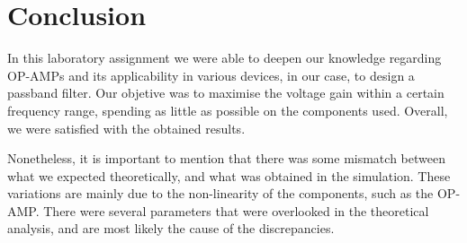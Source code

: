 \section{Conclusion}
\label{resan}
In this laboratory assignment we were able to deepen our knowledge regarding OP-AMPs and its applicability in various devices, in our case, to design a passband filter.
Our objetive was to maximise the voltage gain within a certain frequency range, spending as little as possible on the components used. Overall, we were satisfied with the obtained results.

Nonetheless, it is important to mention that there was some mismatch between what we expected theoretically, and what was obtained in the simulation. These variations are mainly due to the non-linearity of the components, such as the OP-AMP. There were several parameters that were overlooked in the theoretical analysis, and are most likely the cause of the discrepancies.
